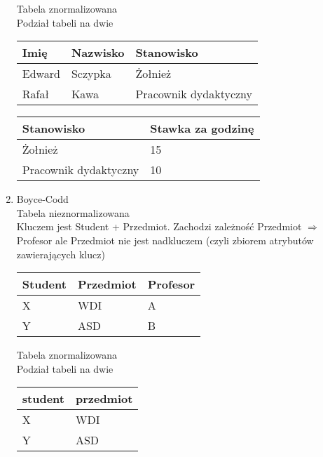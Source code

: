 \documentclass[main.tex]{subfiles}
\begin{document}
\begin{enumerate}
        Tabela znormalizowana\\
        Podział tabeli na dwie

        \begin{table}[H]
            \begin{tabular}{|l|l|l|}
                \hline
                Imię & Nazwisko & Stanowisko            \\ \hline
                Edward & Sczypka & Żołnież               \\ \hline
                Rafał & Kawa & Pracownik dydaktyczny \\ \hline
            \end{tabular}
        \end{table}

        \begin{table}[H]
            \begin{tabular}{|l|l|}
                \hline
                Stanowisko & Stawka za godzinę \\ \hline
                Żołnież & 15                \\ \hline
                Pracownik dydaktyczny & 10                \\ \hline
            \end{tabular}
        \end{table}

        \item{Boyce-Codd}\\
        Tabela nieznormalizowana\\
        Kluczem jest Student + Przedmiot. Zachodzi zależność Przedmiot $\Rightarrow$ Profesor ale Przedmiot nie jest nadkluczem (czyli zbiorem atrybutów zawierających klucz)

        \begin{table}[H]
            \begin{tabular}{|l|l|l|}
                \hline
                \textbf{Student} & \textbf{Przedmiot} & Profesor \\ \hline
                X & WDI & A        \\ \hline
                Y & ASD & B        \\ \hline
            \end{tabular}
        \end{table}

        Tabela znormalizowana\\
        Podział tabeli na dwie

        \begin{table}[H]
            \begin{tabular}{|l|l|}
                \hline
                student & przedmiot \\ \hline
                X & WDI       \\ \hline
                Y & ASD       \\ \hline
            \end{tabular}
        \end{table}


\end{enumerate}
\end{document}
